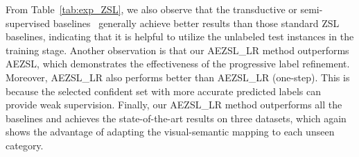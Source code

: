 \documentclass[journal]{IEEEtran}
\begin{document}
From Table~\ref{tab:exp_ZSL}, we also observe that the transductive or semi-supervised baselines~\cite{li2015semi, kodirov2015unsupervised, zhang2016zero, shojaee2016semi,li2015max,guo2016transductive,xu2017transductive} generally achieve better results than those standard ZSL baselines, indicating that it is helpful to utilize the unlabeled test instances in the training stage. Another observation is that our AEZSL\_LR method outperforms AEZSL, which demonstrates the effectiveness of the progressive label refinement. Moreover, AEZSL\_LR also performs better than AEZSL\_LR (one-step). This is because the selected confident set with more accurate predicted labels can provide weak supervision.
Finally, our AEZSL\_LR method outperforms all the baselines and achieves the state-of-the-art results on three datasets, which again shows the advantage of adapting the visual-semantic mapping to each unseen category. 
\end{document}
